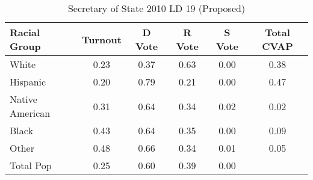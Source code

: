 \begin{table}[htb]
\begin{center}
\caption{Secretary of State 2010 LD 19 (Proposed)}
\label{sos10_cvap_ld_19}
\begin{tabular}{lccccc}
  \hline
Racial Group & Turnout & D Vote & R Vote & S Vote & Total CVAP \\ 
  \hline
White & 0.23 & 0.37 & 0.63 & 0.00 & 0.38 \\ 
  Hispanic & 0.20 & 0.79 & 0.21 & 0.00 & 0.47 \\ 
  Native American & 0.31 & 0.64 & 0.34 & 0.02 & 0.02 \\ 
  Black & 0.43 & 0.64 & 0.35 & 0.00 & 0.09 \\ 
  Other & 0.48 & 0.66 & 0.34 & 0.01 & 0.05 \\ 
  Total Pop & 0.25 & 0.60 & 0.39 & 0.00 &  \\ 
   \hline
\end{tabular}
\end{center}
\end{table}
